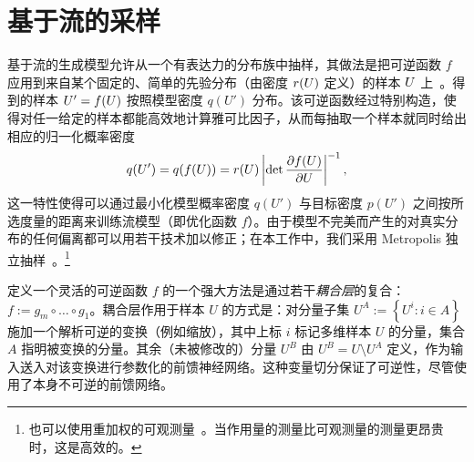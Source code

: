 \section{基于流的采样}
基于流的生成模型允许从一个有表达力的分布族中抽样，其做法是把可逆函数 $f$ 应用到来自某个固定的、简单的先验分布（由密度 $r(U)$ 定义）的样本 $U$ 上~\cite{papamakarios2019normalizing}。得到的样本 $U' = f(U)$ 按照模型密度 $q(U')$ 分布。该可逆函数经过特别构造，使得对任一给定的样本都能高效地计算雅可比因子，从而每抽取一个样本就同时给出相应的归一化概率密度
%
\begin{equation} \label{eqn:norm-flow}
  q(U') = q(f(U)) = r(U) \left| \det \frac{\partial f(U)}{\partial U} \right|^{-1},
\end{equation}
%
这一特性使得可以通过最小化模型概率密度 $q(U')$ 与目标密度 $p(U')$ 之间按所选度量的距离来训练流模型（即优化函数 $f$）。由于模型不完美而产生的对真实分布的任何偏离都可以用若干技术加以修正；在本工作中，我们采用 Metropolis 独立抽样~\cite{Albergo2019FlowMCMC}。\footnote{也可以使用重加权的可观测量~\cite{Ferrenberg:1988yz,mller2018neural}。当作用量的测量比可观测量的测量更昂贵时，这是高效的。}

定义一个灵活的可逆函数 $f$ 的一个强大方法是通过若干\emph{耦合层}的复合：$f := g_m \circ \dots \circ g_1$。耦合层作用于样本 $U$ 的方式是：对分量子集 $U^{A} := \left\{ U^{i} : i \in A \right\}$ 施加一个解析可逆的变换（例如缩放），其中上标 $i$ 标记多维样本 $U$ 的分量，集合 $A$ 指明被变换的分量。其余（未被修改的）分量 $U^B$ 由 $U^B = U \setminus U^A$ 定义，作为输入送入对该变换进行参数化的前馈神经网络。这种变量切分保证了可逆性，尽管使用了本身不可逆的前馈网络。
